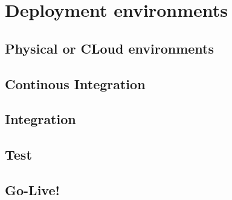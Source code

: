 \chapter{Deployment environments}

\section{Physical or CLoud environments}

\section{Continous Integration}

\section{Integration}

\section{Test}

\section{Go-Live!}